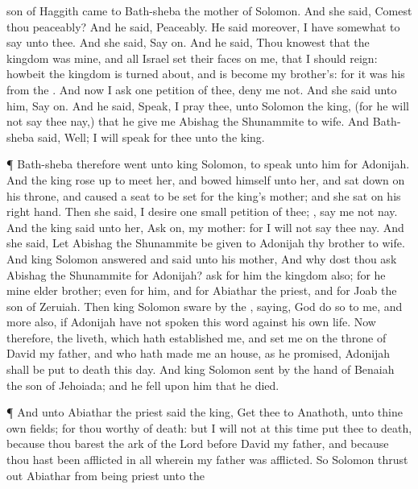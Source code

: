 {son of
Haggith
came to
Bath-sheba the
mother of
Solomon. And she
said,
Comest thou
peaceably? And he
said,
Peaceably.
He
said moreover, I have somewhat to
say unto thee. And she
said, Say
on.
And he
said, Thou
knowest that the
kingdom was mine, and
{} all
Israel
set their
faces on me, that I should
reign: howbeit the
kingdom is turned
about, and is become my
brother’s: for it was his from the
{}.
And now I
ask
one
petition of thee,
deny
me not. And she
said unto him, Say
on.
And he
said,
Speak, I pray thee, unto
Solomon the
king, (for he will not
say
thee
nay,) that he
give me
Abishag the
Shunammite to
wife.
And
Bath-sheba
said,
Well; I will
speak for thee unto the
king.
\par }{\PP {}¶
Bath-sheba therefore
went unto
king
Solomon, to
speak unto him for
Adonijah. And the
king rose
up to
meet her, and
bowed himself unto her, and sat
down on his
throne, and caused a
seat to be
set for the
king’s
mother; and she
sat on his right
hand.
Then she
said, I
desire
one
small
petition of thee;
{},
say
me not
nay. And the
king
said unto her, Ask
on, my
mother: for I will not
say
thee
nay.
And she
said, Let
Abishag the
Shunammite be
given to
Adonijah thy
brother to
wife.
And
king
Solomon
answered and
said unto his
mother, And why dost thou
ask
Abishag the
Shunammite for
Adonijah?
ask for him the
kingdom also; for he
{} mine
elder
brother; even for him, and for
Abiathar the
priest, and for
Joab the
son of
Zeruiah.
Then
king
Solomon
sware by the
{},
saying,
God
do so to me, and more
also, if
Adonijah have not
spoken this
word against his own
life.
Now therefore,
{} the
{}
liveth, which hath
established me, and
set me on the
throne of
David my
father, and who hath
made me an
house, as he
promised,
Adonijah shall be put to
death this
day.
And
king
Solomon
sent by the
hand of
Benaiah the
son of
Jehoiada; and he
fell upon him that he
died.
\par }{\PP {}¶ And unto
Abiathar the
priest
said the
king,
Get thee to
Anathoth, unto thine own
fields; for thou
{}
worthy of
death: but I will not at this
time put thee to
death, because thou
barest the
ark of the
Lord
{}
before
David my
father, and because thou hast been
afflicted in all wherein my
father was
afflicted.
So
Solomon thrust
out
Abiathar from being
priest unto the
}
